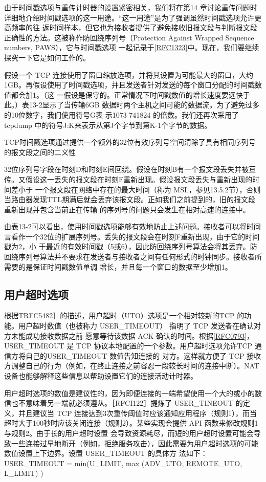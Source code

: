 由于时间戳选项与重传计时器的设置紧密相关，我们将在第14 章讨论重传问题时详细地介绍时间戳选项的这一用途。“这一用途”是为了强调虽然时间戳选项允许更高频率的往
返时间样本，但它也为接收者提供了避免接收旧报文段与判断报文段正确性的方法。这被称作防回绕序列号（Protection Against
Wrapped Sequence numbers, PAWS），它与时间戳选项
一起记录于\href{https://www.rfc-editor.org/rfc/rfc1323}{[RFC1323]}中。现在，我们要继续探究一下它是如何工作的。

假设一个 TCP
连接使用了窗口缩放选项，并将其设置为可能最大的窗口，大约1GB。再假设使用了时间戳选项，并且发送者针对发送的每个窗口分配的时间戳数值都会加1。（这
一假设是保守的。正常情况下时间戳数值的增长速度要远快于此。）表13-2显示了当传输6GB
数据时两个主机之间可能的数据流。为了避免过多的10位数字，我们使用符号G表
示1073 741824 的倍数。我们还再次采用了 tcpdump 中的符号J:K来表示从第J个字节到第K-1个字节的数据。

TCP时间戳选项通过提供一个额外的32位有效序列号空间清除了具有相同序列号的报文段之间的二义性

32位序列号字段在时刻D和时刻E间回绕。假设在时刻B有一个报文段丢失并被亘传。又假设这一丢失的报文段在时刻F重新出现。假设报文段丢失与重新出现的时间差小于
一个报文段在网络中存在的最大时间（称为
MSL，参见13.5.2节），否则当路由器发现TTL期满后就会丢弃该报文段。正如我们之前提到的，旧的报文段重新出现并包含当前正在传输
的序列号的问题只会发生在相对高速的连接中。

由表13-2可以看出，使用时间戳选项能够有效地防止上述问题。接收者可以将时间言看作一个32位的扩展序列号。丢失的报文段会在时刻F重新出现，由于它的时间戳为2，小
于最近的有效时间戳（5或6），因此防回绕序列号算法会将其丢弃。防回绕序列号算法并不要求在发送者与接收者之间有任何形式的时钟同步。接收者所需要的是保证时间戳数值单调
增长，并且每一个窗口的数据至少增加1。

\subsection{用户超时选项}
根据TRFC5482］的描述，用户超时（UTO）选项是一个相对较新的TCP 的功能。用户超时数值（也被称力 USER\_TIMEOUT）
指明了 TCP 发送者在确认对方未能成功接收数据之前
愿意等待该数据 ACK
确认的时间。根据\href{https://www.rfc-editor.org/rfc/rfc0793}{[RFC0793]}，USER\_TIMEOUT
是 TCP 协议本地配置的一个参数。用户超时选项允许TCP 通信方将自己的USER\_TIMEOUT 数值告知连接的
对方。这样就方便了 TCP 接收方调整自己的行为（例如，在终止连接之前容忍一段较长时间的连接中断）。NAT设备也能够解释这些信息以帮助设置它们的连接活动计时器。

用户超时选项的数值是建议性的，因为即便连接的一端希望使用一个大的或小的数信也不意味着另一端就必须遵从。［RFCI122］提炼了
USER\_TINEOUT 的定义，并且建议当
TCP 连接达到3次重传阈值时应该通知应用程序（规则1），而当超时大于100秒时应该关闭连接（规则2）。某些实现会提供 API
函数来修改规则1与规则2。由于长的用户超时设置
会导致资源耗尽，而短的用户超时设置可能会导致一些连接过早地断开（例如，拒绝服务攻击），因此需要为用户超时选项的可能数值设置上下边界。设置
USER\_TIMEOUT 的具体方
法如下：
USER\_TIMEOUT = min(U\_LIMIT, max (ADV\_UTO, REMOTE\_UTO, L\_LIMIT) )

